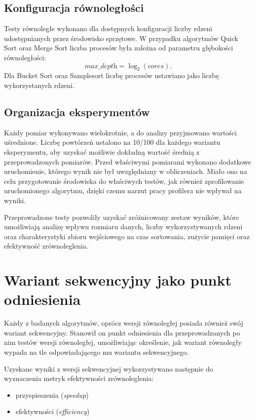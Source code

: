 \subsection{Konfiguracja równoległości}

Testy równoległe wykonano dla dostępnych konfiguracji liczby rdzeni udostępnianych przez środowisko sprzętowe. 
W przypadku algorytmów Quick Sort oraz Merge Sort liczba procesów była zależna od parametru głębokości równoległości:
\[
\textit{max\_depth} = \log_2(\textit{cores}).
\]
Dla Bucket Sort oraz Samplesort liczbę procesów ustawiano jako liczbę wykorzystanych rdzeni.

\subsection{Organizacja eksperymentów}

Każdy pomiar wykonywano wielokrotnie, a do analizy przyjmowano wartości uśrednione. 
Liczbę powtórzeń ustalono na 10/100 dla każdego wariantu eksperymentu, 
aby uzyskać możliwie dokładną wartość średnią z przeprowadzonych pomiarów. Przed właściwymi pomiarami wykonano dodatkowe uruchomienie,
którego wynik nie był uwzględniany w obliczeniach. Miało ono na celu przygotowanie środowiska do właściwych testów, jak również 
zprofilowanie uruchomionego algorytmu, dzięki czemu narzut pracy profilera nie wpływał na wyniki.

Przeprowadzone testy pozwoliły uzyskać zróżnicowany zestaw wyników, które umożliwiają analizę wpływu rozmiaru danych, 
liczby wykorzystywanych rdzeni oraz charakterystyki zbioru wejściowego na czas sortowania, zużycie pamięci oraz efektywność zrównoleglenia.

\section{Wariant sekwencyjny jako punkt odniesienia}
\label{sec:WariantSekwencyjny}

Każdy z badanych algorytmów, oprócz wersji równoległej posiada również swój wariant sekwencyjny. 
Stanowił on punkt odniesienia dla przeprowadzanych po nim testów wersji równoległej, 
umożliwiając określenie, jak wariant równoległy wypada na tle odpowiadającego mu wariantu sekwencyjnego.

Uzyskane wyniki z wersji sekwencyjnej wykorzystywano następnie do wyznaczenia metryk efektywności zrównoleglenia:
\begin{itemize}
    \item przyspieszenia (\textit{speedup})
    \item efektywności (\textit{efficiency})
\end{itemize}

